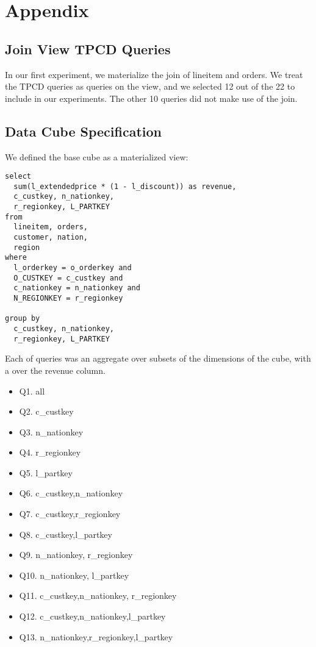 \section{Appendix}

\subsection{Join View TPCD Queries}
In our first experiment, we materialize the join of lineitem and orders.
We treat the TPCD queries as queries on the view, and we selected 12 out of the 22 to include in our experiments.
The other 10 queries did not make use of the join.

\subsection{Data Cube Specification}
We defined the base cube as a materialized view:
\begin{lstlisting}
select
  sum(l_extendedprice * (1 - l_discount)) as revenue,
  c_custkey, n_nationkey,
  r_regionkey, L_PARTKEY
from
  lineitem, orders,
  customer, nation,
  region
where
  l_orderkey = o_orderkey and
  O_CUSTKEY = c_custkey and
  c_nationkey = n_nationkey and
  N_REGIONKEY = r_regionkey

group by
  c_custkey, n_nationkey, 
  r_regionkey, L_PARTKEY
\end{lstlisting}

Each of queries was an aggregate over subsets of the dimensions of the cube, 
with a \sumfunc over the revenue column.
\begin{itemize}
\item Q1. all
\item Q2. c_custkey
\item Q3. n_nationkey
\item Q4. r_regionkey
\item Q5. l_partkey
\item Q6. c_custkey,n_nationkey
\item Q7. c_custkey,r_regionkey
\item Q8. c_custkey,l_partkey
\item Q9. n_nationkey, r_regionkey
\item Q10. n_nationkey, l_partkey
\item Q11. c_custkey,n_nationkey, r_regionkey
\item Q12. c_custkey,n_nationkey,l_partkey
\item Q13. n_nationkey,r_regionkey,l_partkey
\end{itemize}

